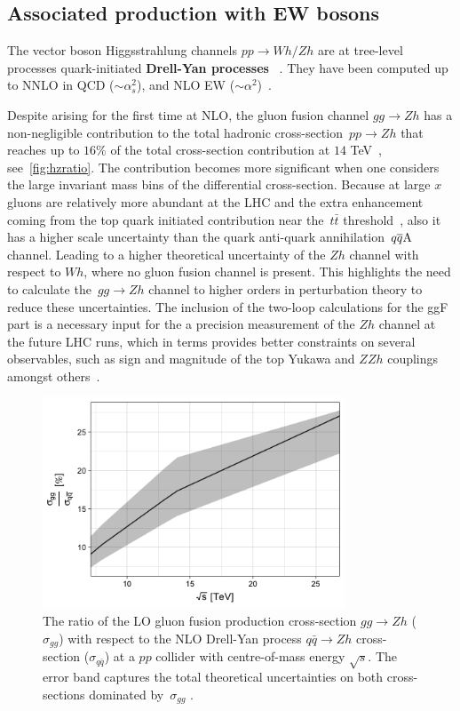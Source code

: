\subsection{Associated production with EW bosons \label{vhproduction}}
The vector boson Higgsstrahlung channels $pp\to Wh/Zh$ are at tree-level processes quark-initiated  \textbf{Drell-Yan processes}~ \cite{Han:1991ia,Brein:2003wg}. They have been computed up to  NNLO in QCD ($\sim \alpha_s^2$), and  NLO EW  ($\sim \alpha^2 $)~\cite{Amoroso:2020lgh}.
\par Despite arising for the first time at NLO, the gluon fusion channel $g g \rightarrow Zh$ has a non-negligible contribution to the total hadronic cross-section~$pp\to Zh$ that reaches up to $16\%$ of the total cross-section contribution at $14$ TeV~\cite{Cepeda:2019klc}, see~\autoref{fig:hzratio}. The contribution becomes more significant when one considers the  large invariant mass bins of the differential cross-section. Because at large $x$ gluons are relatively more abundant at the LHC and the extra enhancement coming from the top quark initiated contribution near the~$t\bar t$ threshold~\cite{Englert:2013vua}, also it has a higher scale uncertainty than the quark anti-quark annihilation~$q\overline q \rm A$ channel. Leading to a higher theoretical uncertainty of the $Zh$ channel with respect to $Wh$, where no gluon fusion channel is present. This highlights the need to calculate the~$g g \rightarrow Z h$ channel to higher orders in perturbation theory to reduce these uncertainties. The inclusion of the two-loop calculations for the ggF part is a necessary input for the a precision measurement of the $Zh$ channel at the future LHC runs, which in terms provides better constraints on several observables, such as sign and magnitude of the top Yukawa and $ZZh$ couplings amongst others~\cite{Englert:2016hvy}.
\begin{figure}
	\begin{center}
		\includegraphics[width=9cm]{./figures/Rplot}
		\caption{The ratio of the LO gluon fusion production cross-section $ gg \to Zh$  ($\sigma_{gg}$) with respect to the NLO Drell-Yan process $ q\bar{q} \to Zh$ cross-section ($\sigma_{q\bar{q}}$) at a $pp$ collider with centre-of-mass energy $\sqrt{s}$. The error band captures the total theoretical uncertainties on both cross-sections dominated by~$\sigma_{gg}$ .}
		\label{fig:hzratio}
	\end{center}
\end{figure}
